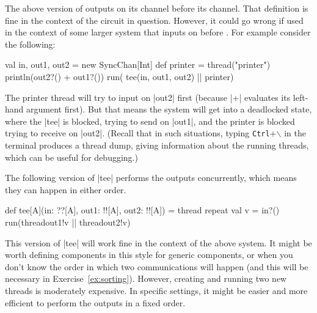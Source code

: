The above version of  outputs on its  channel before
its  channel.  That definition is fine in the context of the
circuit in question.  However, it could go wrong if used in the context of
some larger system that inputs on  before .  For
example consider the following:
%
\begin{scala}
  val in, out1, out2 = new SyncChan[Int]
  def printer = thread("printer"){ println(out2?() + out1?()) } 
  run( tee(in, out1, out2) || printer)
\end{scala}
%
The printer thread will try to input on |out2| first (because |+| evaluates
its left-hand argument first).  But that means the system will get into a
deadlocked state, where the |tee| is blocked, trying to send on |out1|, and
the printer is blocked trying to receive on |out2|.  (Recall that in such
situations, typing \texttt{Ctrl}+$\backslash$ in the terminal produces a
thread dump, giving information about the running threads, which can be useful
for debugging.)


The following version of |tee| performs the outputs concurrently, which means
they can happen in either order.
%
\begin{mysamepage}
\begin{scala}
  def tee[A](in: ??[A], out1: !![A], out2: !![A]) = thread{
    repeat{ 
      val v = in?()
      run(thread{out1!v} || thread{out2!v}) 
    }
  }
\end{scala}
\end{mysamepage}
%
This version of |tee| will work fine in the context of the above system.  It
might be worth defining components in this style for generic components, or
when you don't know the order in which two communications will happen (and
this will be necessary in Exercise~\ref{ex:sorting}).  However, creating and
running two new threads is moderately expensive.  In specific settings, it
might be easier and more efficient to perform the outputs in a fixed order.
